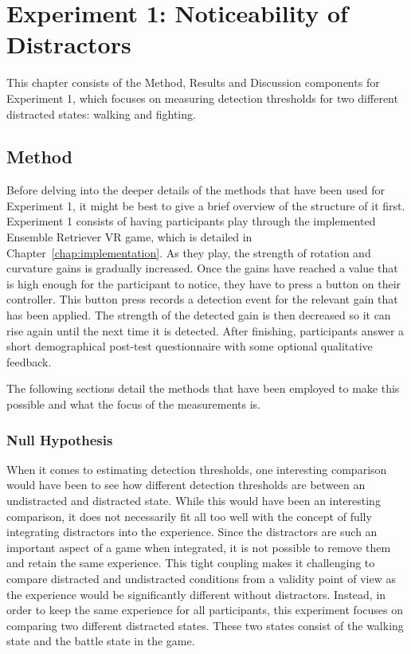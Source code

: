 \chapter{Experiment 1: Noticeability of Distractors}\label{chap:ex1}
This chapter consists of the Method, Results and Discussion components for Experiment 1, which focuses on measuring detection thresholds for two different distracted states: walking and fighting. 

\section{Method}
Before delving into the deeper details of the methods that have been used for Experiment 1, it might be best to give a brief overview of the structure of it first. Experiment 1 consists of having participants play through the implemented Ensemble Retriever VR game, which is detailed in Chapter~\ref{chap:implementation}. As they play, the strength of rotation and curvature gains is gradually increased. Once the gains have reached a value that is high enough for the participant to notice, they have to press a button on their controller. This button press records a detection event for the relevant gain that has been applied. The strength of the detected gain is then decreased so it can rise again until the next time it is detected. After finishing, participants answer a short demographical post-test questionnaire with some optional qualitative feedback. 

The following sections detail the methods that have been employed to make this possible and what the focus of the measurements is. 

\subsection{Null Hypothesis}
When it comes to estimating detection thresholds, one interesting comparison would have been to see how different detection thresholds are between an undistracted and distracted state. While this would have been an interesting comparison, it does not necessarily fit all too well with the concept of fully integrating distractors into the experience. Since the distractors are such an important aspect of a game when integrated, it is not possible to remove them and retain the same experience. This tight coupling makes it challenging to compare distracted and undistracted conditions from a validity point of view as the experience would be significantly different without distractors. Instead, in order to keep the same experience for all participants, this experiment focuses on comparing two different distracted states. These two states consist of the walking state and the battle state in the game. 


